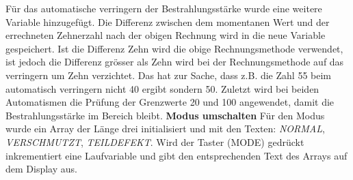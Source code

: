 \newline
Für das automatische verringern der Bestrahlungsstärke wurde eine weitere Variable hinzugefügt. Die Differenz zwischen dem momentanen Wert und der errechneten Zehnerzahl nach der obigen Rechnung wird in die neue Variable gespeichert. Ist die Differenz Zehn wird die obige Rechnungsmethode verwendet, ist jedoch die Differenz grösser als Zehn wird bei der Rechnungsmethode auf das verringern um Zehn verzichtet. Das hat zur Sache, dass z.B. die Zahl 55 beim automatisch verringern nicht 40 ergibt sondern 50. Zuletzt wird bei beiden Automatismen die Prüfung der Grenzwerte 20 und 100 angewendet, damit die Bestrahlungsstärke im Bereich bleibt.
\newline
\textbf{Modus umschalten}
\newline
Für den Modus wurde ein Array der Länge drei initialisiert und mit den Texten: \textit{NORMAL}, \textit{VERSCHMUTZT}, \textit{TEILDEFEKT}. Wird der Taster (MODE) gedrückt inkrementiert eine Laufvariable und gibt den entsprechenden Text des Arrays auf dem Display aus.